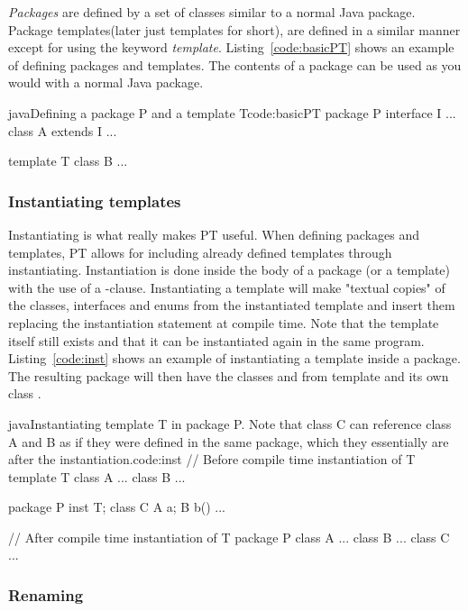 \emph{Packages} are defined by a set of classes similar to a normal Java package.
Package templates(later just templates for short), are defined in a similar manner except for using the keyword \emph{template}.
Listing~\vref{code:basicPT} shows an example of defining packages and templates.
The contents of a package can be used as you would with a normal Java package.

\begin{code}{java}{Defining a package P and a template T}{code:basicPT}
    package P {
        interface I { ... }
        class A extends I { ... }
    }

    template T {
        class B { ... }
    }
\end{code}

\subsubsection{Instantiating templates}\label{subsubsec:inst}
Instantiating is what really makes PT useful.
When defining packages and templates, PT allows for including already defined templates through instantiating.
Instantiation is done inside the body of a package (or a template) with the use of a -clause.
Instantiating a template will make "textual copies" of the  classes, interfaces and enums from the instantiated template and insert them replacing the instantiation statement at compile time.
Note that the template itself still exists and that it can be instantiated again in the same program.
Listing~\vref{code:inst} shows an example of instantiating a template inside a package.
The resulting package  will then have the classes  and  from template  and its own class .

\begin{code}{java}{Instantiating template T in package P. Note that class C can reference class A and B as if they were defined in the same package, which they essentially are after the instantiation.}{code:inst}
// Before compile time instantiation of T
template T {
    class A { ... }
    class B { ... }
}

package P {
    inst T;
    class C {
        A a;
        B b() {
            ...
        }
    }
}

// After compile time instantiation of T
package P {
    class A { ... }
    class B { ... }
    class C { ... }
}
\end{code}

\subsubsection{Renaming}\label{subsubsec:renaming}

